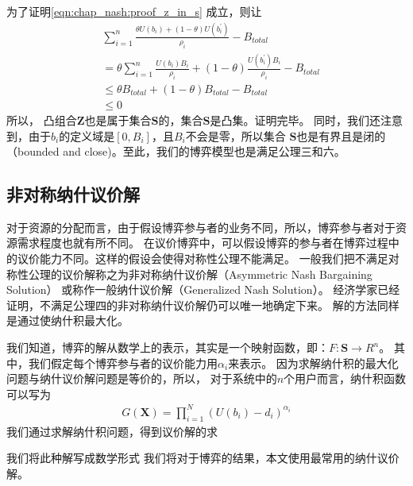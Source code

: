 为了证明\eqref{eqn:chap_nash:proof_z_in_s} 成立，则让
\begin{align*}
    &\sum_{i=1}^{n} \frac{ \theta U(b_i) + (1-\theta) U(b_i^\prime)}{\rho_i} - B_{total} \\
    &= \theta \sum_{i=1}^n \frac{U(b_i)B_i}{\rho_i} + (1-\theta) \frac{U(b_i^\prime)B_i}{\rho_i} -B_{total} \\
    &\le \theta B_{total} + (1-\theta)B_{total} - B_{total}\\
    & \le 0
\end{align*}
所以，
凸组合$\mathbf{Z}$也是属于集合$\mathbf{S}$的，集合$\mathbf{S}$是凸集。证明完毕。
同时，我们还注意到，由于$b_i$的定义域是$[0,B_i]$，且$B_i$不会是零，所以集合
$\mathbf{S}$也是有界且是闭的（bounded and close)。至此，我们的博弈模型也是满足公理三和六。

\subsection{非对称纳什议价解}
对于资源的分配而言，由于假设博弈参与者的业务不同，所以，博弈参与者对于资源需求程度也就有所不同。
在议价博弈中，可以假设博弈的参与者在博弈过程中的议价能力不同。这样的假设会使得对称性公理不能满足。
一般我们把不满足对称性公理的议价解称之为非对称纳什议价解（Asymmetric Nash Bargaining Solution）
或称作一般纳什议价解（Generalized  Nash  Solution）。
经济学家已经证明，不满足公理四的非对称纳什议价解仍可以唯一地确定下来\cite{Osborne_Rubinstein_1994}。
解的方法同样是通过使纳什积最大化。

我们知道，博弈的解从数学上的表示，其实是一个映射函数，即：$F: \mathbf{S} \rightarrow R^n$。
其中，我们假定每个博弈参与者的议价能力用$\alpha_i$来表示。
因为求解纳什积的最大化问题与纳什议价解问题是等价的，所以，
对于系统中的$n$个用户而言，纳什积函数可以写为
\begin{align}
    G(\mathbf{X}) = \prod_{i=1}^N (U(b_i) - d_i)^{\alpha_i}
    \label{eqn:chap_nash:nash_product}
\end{align}
我们通过求解纳什积问题，得到议价解的求

我们将此种解写成数学形式
我们将对于博弈的结果，本文使用最常用的纳什议价解。






